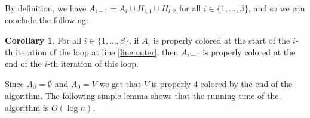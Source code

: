 \documentclass{article}
\theoremstyle{definition}
\newtheorem{corollary}{Corollary}[section]
\begin{document}



By definition, we have $A_{i-1} = A_i \cup H_{i,1} \cup H_{i,2}$ for all $i \in \{1,...,\beta\}$, and so we can conclude the following:

\begin{corollary}  For all $i \in \{1, ..., \beta\}$, if $A_{i}$ is properly colored at the start of the $i$-th iteration of the loop at line \ref{line:outer}, then $A_{i-1}$ is properly colored at the end of the $i$-th iteration of this loop.\end{corollary}

Since $A_{\beta} = \emptyset$ and $A_{0} = V$ we get that $V$ is properly $4$-colored by the end of the algorithm. The following simple lemma shows that the running time of the algorithm is $O(\log{n})$.
\end{document}
